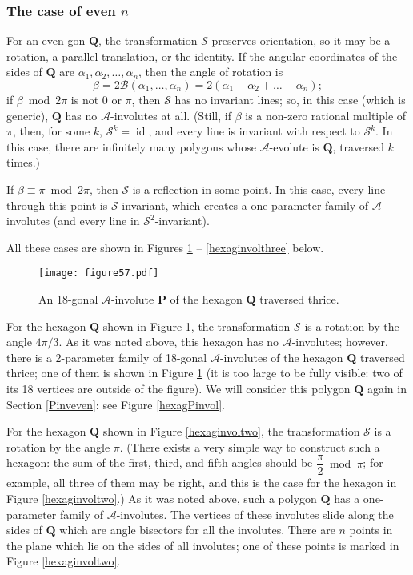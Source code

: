 \documentclass[12pt]{article}
\newcommand{\B}{\mathcal{B}}
\newcommand{\Aev}{\mathcal{A}}
\renewcommand{\P}{\mathbf{P}}
\newcommand{\id}{\operatorname{id}}
\begin{document}
\subsubsection{The case of even $n$}\label{Ainveven}

For an even-gon $\mathbf Q$, the transformation $\mathcal S$ preserves  orientation, so it may be a rotation, a parallel translation, or the identity. If the angular coordinates of the sides of $\mathbf Q$ are $\alpha_1,\alpha_2,\dots,\alpha_n$, then the angle of rotation is 
$$\beta=2\B(\alpha_1,\dots,\alpha_n)= 2(\alpha_1-\alpha_2+\dots-\alpha_n);$$
 if $\beta\bmod2\pi$ is not 0 or $\pi$, then $\mathcal S$ has no invariant lines; so, in this case (which is generic), $\mathbf Q$ has no $\Aev$-involutes at all. (Still, if $\beta$ is a non-zero rational multiple of $\pi$, then, for some $k$, ${\mathcal S}^k=\id$, and every line is invariant with respect to ${\mathcal S}^k$. In this case, there are infinitely many polygons whose $\Aev$-evolute is $\mathbf Q$, traversed $k$ times.) 
 
 If $\beta\equiv\pi\bmod2\pi$, then $\mathcal S$ is a reflection in some point. In this case, every line through this point is $\mathcal S$-invariant, which creates a one-parameter family of $\Aev$-involutes (and every line in ${\mathcal S}^2$-invariant).

All these cases are shown in Figures \ref{hexaginvolone} -- \ref{hexaginvolthree} below.

\begin{figure}[hbtp]
\centering
\texttt{[image: figure57.pdf]}
\caption{An 18-gonal $\Aev$-involute $\P$ of the hexagon $\mathbf Q$ traversed thrice.}
\label{hexaginvolone}
\end{figure}

For the hexagon $\mathbf Q$ shown in Figure \ref{hexaginvolone}, the transformation $\mathcal S$ is a rotation by the angle $4\pi/3$. As it was noted above, this hexagon has no $\Aev$-involutes; however, there is a 2-parameter family of 18-gonal $\Aev$-involutes of the hexagon $\mathbf Q$ traversed thrice; one of them is shown in Figure \ref{hexaginvolone} (it is too large to be fully visible: two of its 18 vertices are outside of the figure). We will consider this polygon $\mathbf Q$ again in Section \ref{Pinveven}: see Figure \ref{hexagPinvol}.

For the hexagon $\mathbf Q$ shown in Figure \ref{hexaginvoltwo}, the transformation $\mathcal S$ is a rotation by the angle $\pi$. (There exists a very simple way to construct such a hexagon: the sum of the first, third, and fifth angles should be $\dfrac{\pi}2\bmod\pi$; for example, all  three of them may be right, and this is the case for the hexagon in Figure \ref{hexaginvoltwo}.) As it was noted above, such a polygon $\mathbf Q$ has a one-parameter family of $\Aev$-involutes. The vertices of these involutes slide along the sides of $\mathbf Q$ which are angle bisectors for all the involutes. There are $n$ points in the plane which lie on the sides of all involutes; one of these points is marked in Figure \ref{hexaginvoltwo}.
\end{document}
